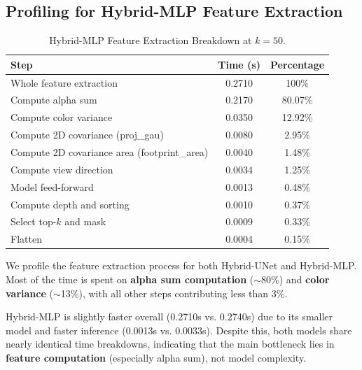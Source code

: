 \documentclass[10pt,letterpaper]{article}
\begin{document}
\subsection*{Profiling for Hybrid-MLP Feature Extraction}
\begin{table}[H]
	\centering
	\scriptsize
	\begin{tabular}{|l|c|c|}
		\hline
		Step & Time (s) & Percentage \\
		\hline
		Whole feature extraction   & 0.2710 & 100\% \\
		Compute alpha sum          & 0.2170 & 80.07\% \\
		Compute color variance     & 0.0350 & 12.92\% \\
		Compute 2D covariance (proj\_gau)      & 0.0080 & 2.95\% \\
		Compute 2D covariance area (footprint\_area) & 0.0040 & 1.48\% \\
		Compute view direction     & 0.0034 & 1.25\% \\
		Model feed-forward         & 0.0013 & 0.48\% \\
		Compute depth and sorting  & 0.0010 & 0.37\% \\
		Select top-$k$ and mask    & 0.0009 & 0.33\% \\
		Flatten                    & 0.0004 & 0.15\% \\
		\hline
	\end{tabular}
	\caption{Hybrid-MLP Feature Extraction Breakdown at $k=50$.}
\end{table}

\noindent We profile the feature extraction process for both Hybrid-UNet and Hybrid-MLP. Most of the time is spent on \textbf{alpha sum computation} ($\sim$80\%) and \textbf{color variance} ($\sim$13\%), with all other steps contributing less than 3\%.

Hybrid-MLP is slightly faster overall (0.2710s vs. 0.2740s) due to its smaller model and faster inference (0.0013s vs. 0.0033s). Despite this, both models share nearly identical time breakdowns, indicating that the main bottleneck lies in \textbf{feature computation} (especially alpha sum), not model complexity.
\end{document}

